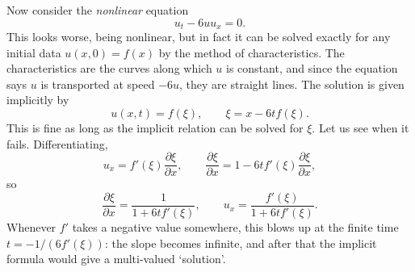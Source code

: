 \begin{example}
	Now consider the \emph{nonlinear} equation
	$$
	u_t - 6uu_x = 0.
	$$
	This looks worse, being nonlinear, but in fact it can be solved exactly for any initial data $u(x,0) = f(x)$ by the method of characteristics. The characteristics are the curves along which $u$ is constant, and since the equation says $u$ is transported at speed $-6u$, they are straight lines. The solution is given implicitly by
	$$
	u(x,t) = f(\xi), \qquad \xi = x - 6tf(\xi).
	$$
	This is fine as long as the implicit relation can be solved for $\xi$. Let us see when it fails. Differentiating,
	$$
	u_x = f'(\xi)\frac{\partial\xi}{\partial x}, \qquad \frac{\partial \xi}{\partial x} = 1 - 6tf'(\xi)\frac{\partial\xi}{\partial x},
	$$
	so
	$$
	\frac{\partial \xi}{\partial x} = \frac{1}{1 + 6tf'(\xi)}, \qquad u_x = \frac{f'(\xi)}{1 + 6tf'(\xi)}.
	$$
	Whenever $f'$ takes a negative value somewhere, this blows up at the finite time $t = -1/(6f'(\xi))$: the slope becomes infinite, and after that the implicit formula would give a multi-valued `solution'.
	\begin{center}
\end{center}
\end{example}
